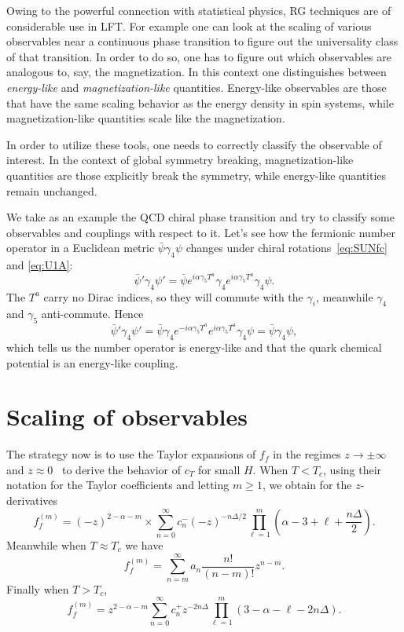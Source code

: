 Owing to the powerful connection with statistical physics, RG techniques are of
considerable use in LFT. For example one can look at the scaling of various
observables near a continuous phase transition to figure out the universality
class of that transition. In order to do so, one has to figure out which
observables are analogous to, say, the magnetization. In this context one
distinguishes between {\it energy-like} and {\it
magnetization-like} quantities. Energy-like
observables are those that have the same scaling behavior as the energy density
in spin systems, while magnetization-like quantities scale like the
magnetization.

In order to utilize these tools, one needs to correctly classify the observable
of interest. In the context of global symmetry breaking, magnetization-like
quantities are those explicitly break the symmetry, while energy-like quantities
remain unchanged.

We take as an example the QCD chiral phase transition and try to classify some
observables and couplings with respect to it. Let's see how the fermionic
number operator in a Euclidean metric $\bar{\psi}\gamma_4\psi$ changes under
chiral rotations~\eqref{eq:SUNfc} and \eqref{eq:U1A}:
\begin{equation}
  \bar{\psi}'\gamma_4\psi'
    =\bar{\psi}e^{i\alpha\gamma_5T^a}\gamma_4e^{i\alpha\gamma_5T^a}\gamma_4\psi.
\end{equation}
The $T^a$ carry no Dirac indices, so they will commute with the $\gamma_i$,
meanwhile $\gamma_4$ and $\gamma_5$ anti-commute. Hence
\begin{equation}
  \bar{\psi}'\gamma_4\psi'
    =\bar{\psi}\gamma_4e^{-i\alpha\gamma_5T^a}e^{i\alpha\gamma_5T^a}\gamma_4\psi
    =\bar{\psi}\gamma_4\psi,
\end{equation}
which tells us the number operator is energy-like and that the quark chemical
potential is an energy-like coupling.

\section{Scaling of observables}


The strategy now is to use the Taylor expansions of $f_f$ in the regimes
$z\to\pm\infty$ and $z\approx 0$~\cite{Engels:2011km} to derive the
behavior of $c_T$ for small $H$. When $T<T_c$, using their
notation for the Taylor coefficients and letting $m\geq1$,
we obtain for the $z$-derivatives
\begin{equation}
    f_f^{(m)}=(-z)^{2-\alpha-m}
    \times\sum_{n=0}^\infty c_n^-(-z)^{-n\Delta/2}\prod_{\ell=1}^m\left(\alpha-3+\ell+\frac{n\Delta}{2}\right).
\end{equation}
Meanwhile when $T\approx T_c$ we have 
\begin{equation}
    f_f^{(m)}=\sum_{n=m}^\infty a_n\frac{n!}{(n-m)!}z^{n-m}.
\end{equation}
Finally when $T>T_c$,
\begin{equation}
    f_f^{(m)}=z^{2-\alpha-m}\sum_{n=0}^\infty c_n^+z^{-2n\Delta}\prod_{\ell=1}^m\left(3-\alpha-\ell-2n\Delta\right).
\end{equation}





